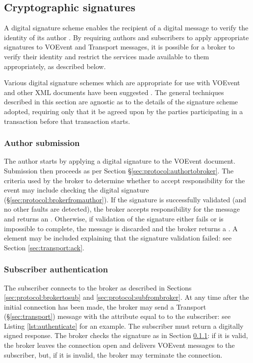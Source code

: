 \documentclass[a4paper,11pt]{ivoa}
\begin{document}
\subsection{Cryptographic signatures}
\label{sec:limit:crypto}

A digital signature scheme enables the recipient of a digital message to
verify the identity of its author \citep{Diffie:1976}. By requiring authors
and subscribers to apply appropriate signatures to VOEvent and Transport
messages, it is possible for a broker to verify their identity and restrict
the services made available to them appropriately, as described below.

Various digital signature schemes which are appropriate for use with VOEvent
and other XML documents have been suggested \citep{Allen:2008, Denny:2008}.
The general techniques described in this section are agnostic as to the
details of the signature scheme adopted, requiring only that it be agreed upon
by the parties participating in a transaction before that transaction starts.

\subsubsection{Author submission}
\label{sec:limit:crypto:author}

The author starts by applying a digital signature to the VOEvent document.
Submission then proceeds as per Section \S\ref{sec:protocol:authortobroker}.
The criteria used by the broker to determine whether to accept responsibility
for the event may include checking the digital signature
(\S\ref{sec:protocol:brokerfromauthor}). If the signature is successfully
validated (and no other faults are detected), the broker accepts
responsibility for the message and returns an .  Otherwise, if
validation of the signature either fails or is impossible to complete, the
message is discarded and the broker returns a . A
 element may be included explaining that the signature
validation failed: see Section \ref{sec:transport:ack}.

\subsubsection{Subscriber authentication}
\label{sec:limit:crypto:subscriber}

The subscriber connects to the broker as described in Sections
\ref{sec:protocol:brokertosub} and \ref{sec:protocol:subfrombroker}. At any
time after the initial connection has been made, the broker may send a
Transport (\S\ref{sec:transport}) message with the  attribute
equal to  to the subscriber: see Listing
\ref{lst:authenticate} for an example. The subscriber must return a digitally
signed  response. The broker checks the signature as in
Section \ref{sec:limit:crypto:author}: if it is valid, the broker leaves the
connection open and delivers VOEvent messages to the subscriber, but, if it is
invalid, the broker may terminate the connection.
\end{document}
